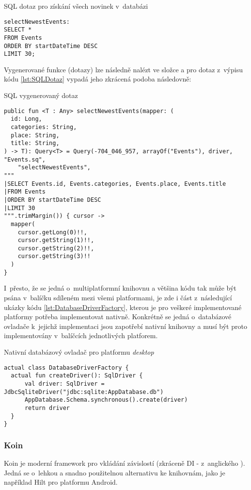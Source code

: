\begin{listing}[H]
\caption{SQL dotaz pro získání všech novinek v~databázi}\label{lst:SQLDotaz}
\begin{verbatim}
selectNewestEvents:
SELECT *
FROM Events
ORDER BY startDateTime DESC
LIMIT 30;
\end{verbatim}
\end{listing}

Vygenerované funkce (dotazy) lze následně nalézt ve složce  a pro dotaz z~výpisu kódu \ref{lst:SQLDotaz}
vypadá jeho zkrácená podoba následovně:

\begin{listing}[H]
\caption{SQL vygenerovaný dotaz}\label{lst:SQLGeneratedDotaz}
\begin{verbatim}
public fun <T : Any> selectNewestEvents(mapper: (
  id: Long,
  categories: String,
  place: String,
  title: String,
) -> T): Query<T> = Query(-704_046_957, arrayOf("Events"), driver, "Events.sq",
    "selectNewestEvents", 
"""
|SELECT Events.id, Events.categories, Events.place, Events.title
|FROM Events
|ORDER BY startDateTime DESC
|LIMIT 30
""".trimMargin()) { cursor ->
  mapper(
    cursor.getLong(0)!!,
    cursor.getString(1)!!,
    cursor.getString(2)!!,
    cursor.getString(3)!!
  )
}
\end{verbatim}
\end{listing}

I~přesto, že se jedná o~multiplatformní knihovnu a většina kódu tak může být psána v~balíčku sdíleném mezi všemi platformami, je zde i 
část z~následující ukázky kódu \ref{lst:DatabaseDriverFactory}, kterou je pro veškeré implementované platformy potřeba implementovat
nativně. Konkrétně se jedná o~databázové ovladače k~jejichž implementaci jsou 
zapotřebí nativní knihovny a musí být proto implementovány v~balíčcích jednotlivých platforem.

\begin{listing}[H]
\caption{Nativní databázový ovladač pro platformu \textit{desktop}}\label{lst:DatabaseDriverFactory}
\begin{verbatim}
actual class DatabaseDriverFactory {
  actual fun createDriver(): SqlDriver {
      val driver: SqlDriver = JdbcSqliteDriver("jdbc:sqlite:AppDatabase.db")
      AppDatabase.Schema.synchronous().create(driver)
      return driver
  }
}
\end{verbatim}
\end{listing}

\subsubsection*{Koin}
Koin je moderní framework pro vkládání závislostí (zkráceně DI - z~anglického ). Jedná se o~lehkou a snadno 
použitelnou alternativu ke knihovnám, jako je například Hilt pro platformu Android.

